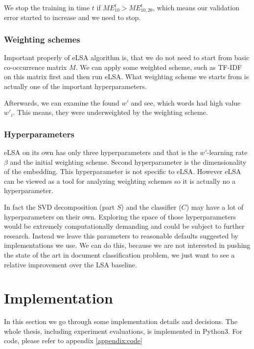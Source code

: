     We stop the training in time $t$ if $ME_{10}^t > ME_{10,20}^t$, which means our validation error started to increase and we need to stop.
    
    \subsubsection{Weighting schemes}
    
    Important properly of eLSA algorithm is, that we do not need to start from basic co-occurrence matrix $M$. 
    We can apply some weighted scheme, such as TF-IDF on this matrix first and then run eLSA.
    What weighting scheme we starts from is actually one of the important hyperparameters.
    
    Afterwards, we can examine the found $w'$ and see, which words had high value $w'_i$.
    This means, they were underweighted by the weighting scheme.

    \subsubsection{Hyperparameters} \label{sec:hyperparams}
    
    eLSA on its own has only three hyperparameters and that is the $w'$-learning rate $\beta$ and the initial weighting scheme. 
    Second hyperparameter is the dimensionality of the embedding. 
    This hyperparameter is not specific to eLSA.
    However eLSA can be viewed as a tool for analyzing weighting schemes so it is actually no a hyperparameter.
    
    In fact the SVD decomposition (part $S$) and the classifier ($C$) may have a lot of hyperparameters on their own.
    Exploring the space of those hyperparameters would be extremely computationally demanding and could be subject to further research.
    Instead we leave this parameters to reasonable defaults suggested by implementations we use.
    We can do this, because we are not interested in pushing the state of the art in document classification problem, we just want to see a relative improvement over the LSA baseline.


\section{Implementation}
    
    In this section we go through some implementation details and decisions.
    The whole thesis, including experiment evaluations, is implemented in Python3.
    For code, please refer to appendix \ref{appendix:code}

